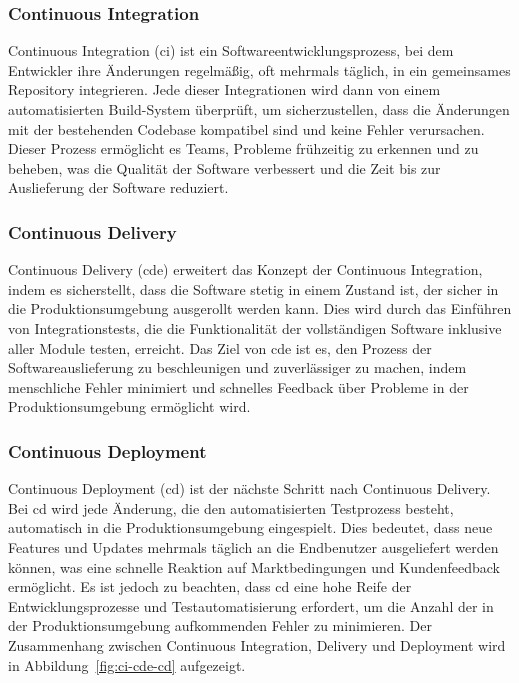 \subsubsection{Continuous Integration}

Continuous Integration (\acrshort{ci}) ist ein Softwareentwicklungsprozess, bei dem Entwickler ihre Änderungen
regelmäßig, oft mehrmals täglich, in ein gemeinsames Repository integrieren.
Jede dieser Integrationen wird dann von einem automatisierten Build-System überprüft, um sicherzustellen, dass die
Änderungen mit der bestehenden Codebase kompatibel sind und keine Fehler verursachen.
Dieser Prozess ermöglicht es Teams, Probleme frühzeitig zu erkennen und zu beheben, was die Qualität der Software
verbessert und die Zeit bis zur Auslieferung der Software reduziert.

\subsubsection{Continuous Delivery}

Continuous Delivery (\acrshort{cde}) erweitert das Konzept der Continuous Integration, indem es sicherstellt, dass die
Software stetig in einem Zustand ist, der sicher in die Produktionsumgebung ausgerollt werden kann.
Dies wird durch das Einführen von Integrationstests, die die Funktionalität der vollständigen Software inklusive aller
Module testen, erreicht.
Das Ziel von \acrshort{cde} ist es, den Prozess der Softwareauslieferung zu beschleunigen und zuverlässiger zu machen,
indem menschliche Fehler minimiert und schnelles Feedback über Probleme in der Produktionsumgebung ermöglicht wird.

\subsubsection{Continuous Deployment}

Continuous Deployment (\acrshort{cd}) ist der nächste Schritt nach Continuous Delivery.
Bei \acrshort{cd} wird jede Änderung, die den automatisierten Testprozess besteht, automatisch in die
Produktionsumgebung eingespielt.
Dies bedeutet, dass neue Features und Updates mehrmals täglich an die Endbenutzer ausgeliefert werden können, was eine
schnelle Reaktion auf Marktbedingungen und Kundenfeedback ermöglicht.
Es ist jedoch zu beachten, dass \acrshort{cd} eine hohe Reife der Entwicklungsprozesse und Testautomatisierung
erfordert, um die Anzahl der in der Produktionsumgebung aufkommenden Fehler zu minimieren.
Der Zusammenhang zwischen Continuous Integration, Delivery und Deployment wird in Abbildung\ \ref{fig:ci-cde-cd}
aufgezeigt.

